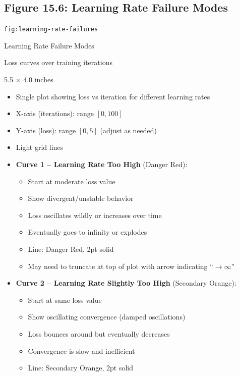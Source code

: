 \documentclass[12pt]{article}
\begin{document}
\newpage

\subsection{Figure 15.6: Learning Rate Failure Modes}

\begin{description}[style=nextline, leftmargin=0pt]
    \item[Figure ID] \texttt{fig:learning-rate-failures}
    \item[Title] Learning Rate Failure Modes
    \item[Type] Loss curves over training iterations
    \item[Size] 5.5 $\times$ 4.0 inches

    \item[Visual Description]
    \begin{itemize}
        \item Single plot showing loss vs iteration for different learning rates
        \item X-axis (iterations): range $[0, 100]$
        \item Y-axis (loss): range $[0, 5]$ (adjust as needed)
        \item Light grid lines

        \item \textbf{Curve 1 -- Learning Rate Too High} (Danger Red):
        \begin{itemize}
            \item Start at moderate loss value
            \item Show divergent/unstable behavior
            \item Loss oscillates wildly or increases over time
            \item Eventually goes to infinity or explodes
            \item Line: Danger Red, 2pt solid
            \item May need to truncate at top of plot with arrow indicating ``$\to \infty$''
        \end{itemize}

        \item \textbf{Curve 2 -- Learning Rate Slightly Too High} (Secondary Orange):
        \begin{itemize}
            \item Start at same loss value
            \item Show oscillating convergence (damped oscillations)
            \item Loss bounces around but eventually decreases
            \item Convergence is slow and inefficient
            \item Line: Secondary Orange, 2pt solid
        \end{itemize}


\end{itemize}
\end{description}
\end{document}
